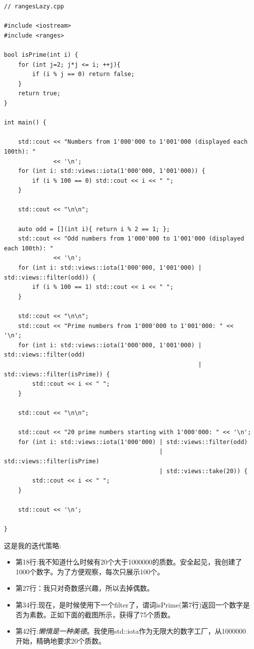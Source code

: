 \begin{lstlisting}[style=styleCXX]
// rangesLazy.cpp

#include <iostream>
#include <ranges>

bool isPrime(int i) {
	for (int j=2; j*j <= i; ++j){
		if (i % j == 0) return false;
	}
	return true;
}

int main() {
	
	std::cout << "Numbers from 1'000'000 to 1'001'000 (displayed each 100th): "
	          << '\n';
	for (int i: std::views::iota(1'000'000, 1'001'000)) {
		if (i % 100 == 0) std::cout << i << " ";
	}
	
	std::cout << "\n\n";
	
	auto odd = [](int i){ return i % 2 == 1; };
	std::cout << "Odd numbers from 1'000'000 to 1'001'000 (displayed each 100th): "
	          << '\n';
	for (int i: std::views::iota(1'000'000, 1'001'000) | std::views::filter(odd)) {
		if (i % 100 == 1) std::cout << i << " ";
	}
	
	std::cout << "\n\n";
	std::cout << "Prime numbers from 1'000'000 to 1'001'000: " << '\n';
	for (int i: std::views::iota(1'000'000, 1'001'000) | std::views::filter(odd)
	                                                   | std::views::filter(isPrime)) {
		std::cout << i << " ";
	}
	
	std::cout << "\n\n";
	
	std::cout << "20 prime numbers starting with 1'000'000: " << '\n';
	for (int i: std::views::iota(1'000'000) | std::views::filter(odd)
	                                        | std::views::filter(isPrime)
	                                        | std::views::take(20)) {
		std::cout << i << " ";
	}
	
	std::cout << '\n';

}
\end{lstlisting}

这是我的迭代策略:

\begin{itemize}
\item 
第18行:我不知道什么时候有20个大于1000000的质数。安全起见，我创建了1000个数字。为了方便观察，每次只展示100个。

\item 
第27行：我只对奇数感兴趣，所以去掉偶数。

\item 
第34行:现在，是时候使用下一个filter了，谓词isPrime(第7行)返回一个数字是否为素数。正如下面的截图所示，获得了75个质数。

\item 
第42行:\textit{懒惰是一种美德}。我使用std::iota作为无限大的数字工厂，从1000000开始，精确地要求20个质数。
\end{itemize}


